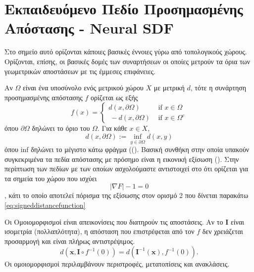 \section{Εκπαιδευόμενο Πεδίο Προσημασμένης Απόστασης - Neural SDF}
\label{section:sdf}
Στο σημείο αυτό ορίζονται κάποιες βασικές έννοιες γύρω από τοπολογικούς χώρους.  Ορίζονται, επίσης, οι βασικές δομές των συναρτήσεων οι οποίες μετρούν τα όρια των γεωμετρικών αποστάσεων με τις έμμεσες επιφάνειες.

\begin{definition}
    Αν $\Omega$ είναι ένα υποσύνολο ενός μετρικού χώρου $X$ με μετρική $d$, τότε η συνάρτηση προσημασμένης απόστασης $f$ ορίζεται ως εξής
    $$
    f(x)= \begin{cases}d(x, \partial \Omega) & \text { if } x \in \Omega \\\ -d(x, \partial \Omega) & \text { if } x \in \Omega^c\end{cases}
    $$
    όπου $\partial \Omega$ δηλώνει το όριο του $\Omega$. Για κάθε $x \in X$,
    $$
    d(x, \partial \Omega):=\inf _{y \in \partial \Omega} d(x, y)
    $$
    όπου inf δηλώνει το μέγιστο κάτω φράγμα ((). 
    Βασική συνθήκη στην οποία υπακούν συγκεκριμένα τα πεδία απόστασης με πρόσημο είναι η εικονική εξίσωση (). Στην περίπτωση των πεδίων με των οποίων ασχολούμαστε αντιστοιχεί στο ότι ορίζεται για τα σημεία του χώρου που ισχύει 
    $$ |\nabla F| - 1 = 0$$, κάτι το οποίο αποτελεί πόρισμα της εξίσωσης στον ορισμό 2 που δίνεται παρακάτω \ref{eq:signeddistancefunction}
\end{definition}
\begin{definition}[Ομοιομορφισμοί]
    Οι Ομοιομορφισμοί είναι απεικονίσεις που διατηρούν τις αποστάσεις. Αν το $\boldsymbol{I}$ είναι ισομετρία (πολλαπλότητα), η απόσταση που επιστρέφεται από τον $f$ δεν χρειάζεται προσαρμογή και είναι πλήρως αντιστρέψιμος.
    $$
    d\left(\boldsymbol{x}, \boldsymbol{I} \circ f^{-1}(0)\right)=d\left(\boldsymbol{I}^{-1}(\boldsymbol{x}), f^{-1}(0)\right) .
    $$
    Οι ομοιομορφισμοί περιλαμβάνουν περιστροφές, μετατοπίσεις και ανακλάσεις.
\end{definition}
